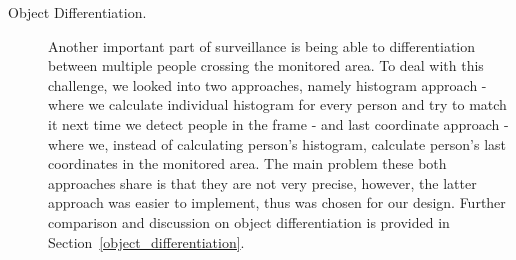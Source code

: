 \begin{description}
\item[Object Differentiation.] Another important part of surveillance is being able to differentiation between multiple people crossing the monitored area. To deal with this challenge, we looked into two approaches, namely histogram approach - where we calculate individual histogram for every person and try to match it next time we detect people in the frame - and last coordinate approach - where we, instead of calculating person's histogram, calculate person's last coordinates in the monitored area. The main problem these both approaches share is that they are not very precise, however, the latter approach was easier to implement, thus was chosen for our design. Further comparison and discussion on object differentiation is provided in Section~\ref{object_differentiation}.
\end{description}

